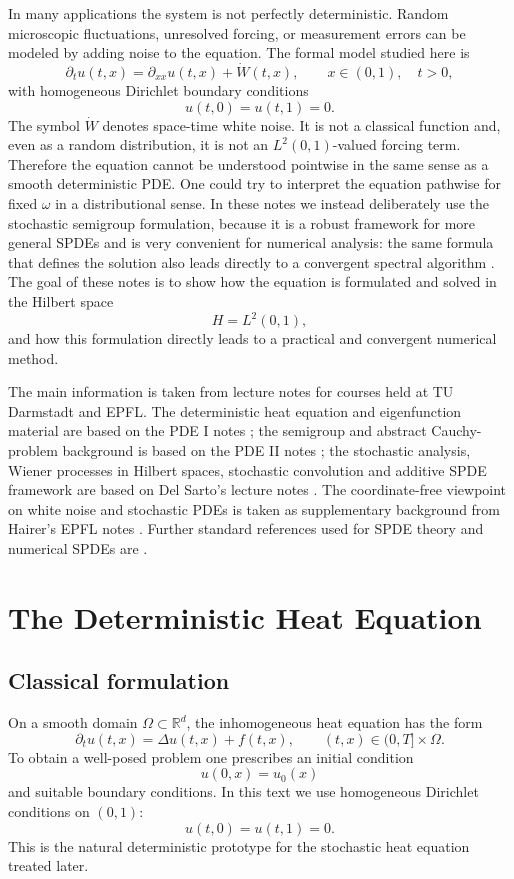 \documentclass[11pt,a4paper]{article}
\newcommand{\R}{\mathbb{R}}
\begin{document}
In many applications the system is not perfectly deterministic. Random
microscopic fluctuations, unresolved forcing, or measurement errors can be
modeled by adding noise to the equation. The formal model studied here is
\[
  \partial_t u(t,x)=\partial_{xx}u(t,x)+\dot W(t,x),
  \qquad x\in(0,1),\quad t>0,
\]
with homogeneous Dirichlet boundary conditions
\[
  u(t,0)=u(t,1)=0.
\]
The symbol \(\dot W\) denotes space-time white noise. It is not a classical
function and, even as a random distribution, it is not an \(L^2(0,1)\)-valued
forcing term. Therefore the equation cannot be understood pointwise in the same
sense as a smooth deterministic PDE. One could try to interpret the equation
pathwise for fixed \(\omega\) in a distributional sense. In these notes we
instead deliberately use the stochastic semigroup formulation, because it is a
robust framework for more general SPDEs and is very convenient for numerical
analysis: the same formula that defines the solution also leads directly to a
convergent spectral algorithm \cite{delSarto2025,daPratoZabczyk,lordPowellShardlow}.
The goal of these notes is to show how the equation is formulated and solved in
the Hilbert space
\[
  H=L^2(0,1),
\]
and how this formulation directly leads to a practical and convergent numerical
method.

The main information is taken from lecture notes for courses held at TU
Darmstadt and EPFL. The deterministic heat equation and eigenfunction material
are based on the PDE I notes \cite{stinnerPDE1}; the semigroup and abstract
Cauchy-problem background is based on the PDE II notes \cite{stinnerPDE2}; the
stochastic analysis, Wiener processes in Hilbert spaces, stochastic convolution
and additive SPDE framework are based on Del Sarto's lecture notes
\cite{delSarto2025}. The coordinate-free viewpoint on white noise and
stochastic PDEs is taken as supplementary background from Hairer's EPFL notes
\cite{hairer2009}. Further standard references used for SPDE theory and
numerical SPDEs are \cite{daPratoZabczyk,lordPowellShardlow}.

\section{The Deterministic Heat Equation}

\subsection{Classical formulation}

On a smooth domain \(\Omega\subset\R^d\), the inhomogeneous heat equation has the
form
\[
  \partial_t u(t,x)=\Delta u(t,x)+f(t,x),
  \qquad (t,x)\in(0,T]\times\Omega.
\]
To obtain a well-posed problem one prescribes an initial condition
\[
  u(0,x)=u_0(x)
\]
and suitable boundary conditions. In this text we use homogeneous Dirichlet
conditions on \((0,1)\):
\[
  u(t,0)=u(t,1)=0.
\]
This is the natural deterministic prototype for the stochastic heat equation
treated later.
\end{document}

